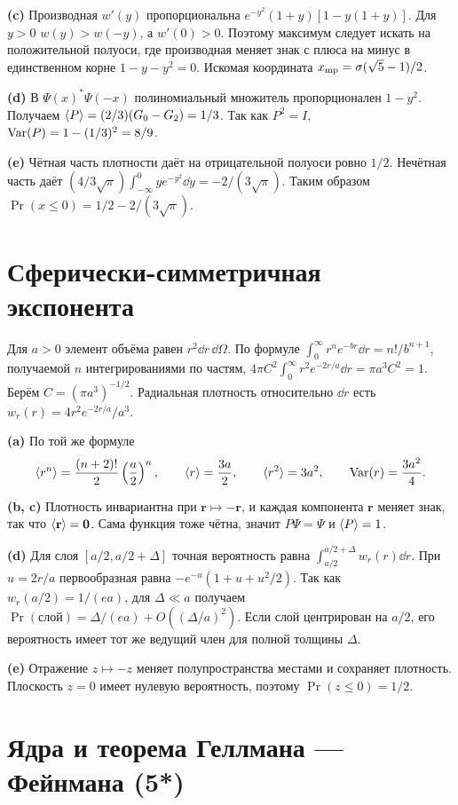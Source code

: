 \documentclass[11pt,a4paper]{article}
\begin{document}
\textbf{(c)} Производная \(w'(y)\) пропорциональна
\(e^{-y^2}(1+y)[1-y(1+y)]\). Для \(y>0\)
\(w(y)>w(-y)\), а \(w'(0)>0\). Поэтому максимум следует искать
на положительной полуоси, где производная меняет знак с плюса на
минус в единственном корне \(1-y-y^2=0\).
Искомая координата \(x_{\rm mp}=\sigma(\sqrt5-1)/2\).

\textbf{(d)} В \(\Psi(x)^*\Psi(-x)\) полиномиальный множитель
пропорционален \(1-y^2\). Получаем
\(\langle P\rangle=(2/3)(G_0-G_2)=1/3\). Так как \(P^2=I\),
\(\operatorname{Var}(P)=1-(1/3)^2=8/9\).

\textbf{(e)} Чётная часть плотности даёт на отрицательной
полуоси ровно \(1/2\). Нечётная часть даёт
\((4/3\sqrt\pi)\int_{-\infty}^0 y e^{-y^2}\dd y=-2/(3\sqrt\pi)\).
Таким образом \(\Pr(x\le0)=1/2-2/(3\sqrt\pi)\).

\section{Сферически-симметричная экспонента}

Для \(a>0\) элемент объёма равен \(r^2\dd r\,\dd\Omega\).
По формуле \(\int_0^\infty r^n e^{-br}\dd r=n!/b^{n+1}\),
получаемой \(n\) интегрированиями по частям,
\(4\pi C^2\int_0^\infty r^2 e^{-2r/a}\dd r=\pi a^3 C^2=1\).
Берём \(C=(\pi a^3)^{-1/2}\). Радиальная плотность относительно
\(\dd r\) есть \(w_r(r)=4r^2e^{-2r/a}/a^3\).

\textbf{(a)} По той же формуле
\[
 \langle r^n\rangle=\frac{(n+2)!}{2}\left(\frac a2\right)^n,\qquad
 \langle r\rangle=\frac{3a}{2},\qquad \langle r^2\rangle=3a^2,\qquad
 \operatorname{Var}(r)=\frac{3a^2}{4}.
\]

\textbf{(b, c)} Плотность инвариантна при \(\mathbf r\mapsto-\mathbf r\),
и каждая компонента \(\mathbf r\) меняет знак, так что
\(\langle \mathbf r\rangle=\mathbf 0\). Сама функция тоже чётна, значит
\(P\Psi=\Psi\) и \(\langle P\rangle=1\).

\textbf{(d)} Для слоя \([a/2,a/2+\Delta]\) точная вероятность
равна \(\int_{a/2}^{a/2+\Delta} w_r(r)\dd r\). При \(u=2r/a\)
первообразная равна \(-e^{-u}(1+u+u^2/2)\).
Так как \(w_r(a/2)=1/(ea)\), для \(\Delta\ll a\) получаем
\(\Pr(\text{слой})=\Delta/(ea)+O((\Delta/a)^2)\).
Если слой центрирован на \(a/2\), его вероятность имеет тот же
ведущий член для полной толщины \(\Delta\).

\textbf{(e)} Отражение \(z\mapsto-z\) меняет полупространства
местами и сохраняет плотность. Плоскость \(z=0\) имеет нулевую
вероятность, поэтому \(\Pr(z\le0)=1/2\).

\section{Ядра и теорема Геллмана --- Фейнмана (5*)}
\end{document}
